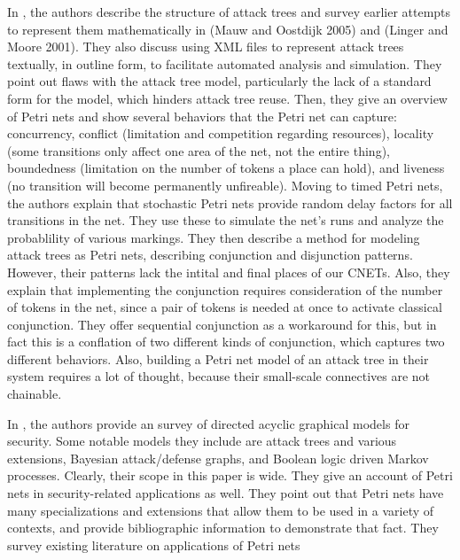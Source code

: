 In \cite{1652085}, the authors describe the structure of attack trees and survey earlier attempts to represent them mathematically in (Mauw and Oostdijk 2005) and (Linger and Moore 2001). They also discuss using XML files to represent attack trees textually, in outline form, to facilitate automated analysis and simulation. They point out flaws with the attack tree model, particularly the lack of a standard form for the model, which hinders attack tree reuse. Then, they give an overview of Petri nets and show several behaviors that the Petri net can capture: concurrency, conflict (limitation and competition regarding resources), locality (some transitions only affect one area of the net, not the entire thing), boundedness (limitation on the number of tokens a place can hold), and liveness (no transition will become permanently unfireable). Moving to timed Petri nets, the authors explain that stochastic Petri nets provide random delay factors for all transitions in the net. They use these to simulate the net's runs and analyze the probablility of various markings. They then describe a method for modeling attack trees as Petri nets, describing conjunction and disjunction patterns. However, their patterns lack the intital and final places of our CNETs. Also, they explain that implementing the conjunction requires consideration of the number of tokens in the net, since a pair of tokens is needed at once to activate classical conjunction. They offer sequential conjunction as a workaround for this, but in fact this is a conflation of two different kinds of conjunction, which captures two different behaviors. Also, building a Petri net model of an attack tree in their system requires a lot of thought, because their small-scale connectives are not chainable. 

In \cite{KORDY20141}, the authors provide an survey of directed acyclic graphical models for security. Some notable models they include are attack trees and various extensions, Bayesian attack/defense graphs, and Boolean logic driven Markov processes. Clearly, their scope in this paper is wide. They give an account of Petri nets in security-related applications as well. They point out that Petri nets have many specializations and extensions that allow them to be used in a variety of contexts, and provide bibliographic information to demonstrate that fact. They survey existing literature on applications of Petri nets
